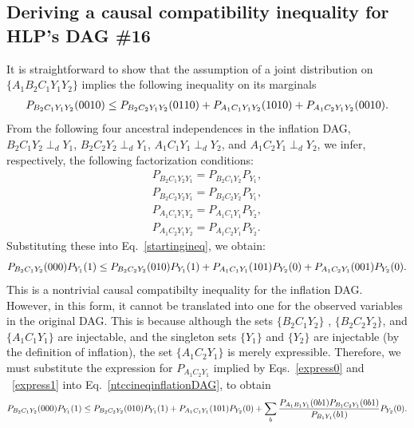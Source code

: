 \documentclass[aps,english,10pt,superscriptaddress,onecolumn,twoside,longbibliography,pra,floatfix,fleqn,nofootinbib]{revtex4-1}%
\theoremstyle{definition}
\newcounter{example}[section]
\newcommand{\p}[2][]{{P_{#1}}\parenths{#2}}
\DeclarePairedDelimiter{\parenths}{\lparen}{\rparen}
\begin{document}

\subsection{Deriving a causal compatibility inequality for HLP's DAG \#16}

It is straightforward to show that the assumption of a joint distribution on $\{ A_1 B_2 C_1 Y_1 Y_2\}$ implies the following inequality on its marginals
\begin{align}\label{startingineq}
    \p[B_2 C_1Y_1 Y_2]{0010} \leq \p[B_2 C_2Y_1 Y_2]{0110} + \p[A_1 C_1 Y_1 Y_2]{10 10}+\p[A_1 C_2 Y_1 Y_2]{0010}.
\end{align}
From the following four ancestral independences in the inflation DAG, $B_2 C_1  Y_2 \perp_d Y_1$, $B_2 C_2 Y_2 \perp_d Y_1$, $A_1 C_1 Y_1 \perp_d Y_2$, and $A_1 C_2 Y_1 \perp_d Y_2$, we infer, respectively, the following factorization conditions:
\begin{align}
P_{B_2 C_1  Y_2 Y_1}=P_{B_2 C_1  Y_2}P_{Y_1},\nonumber\\
P_{B_2 C_2 Y_2 Y_1}=P_{B_2 C_2  Y_2}P_{Y_1},\nonumber\\
P_{A_1 C_1 Y_1  Y_2}=P_{A_1 C_1 Y_1 }P_{Y_2},\nonumber\\
P_{A_1 C_2 Y_1  Y_2}=P_{A_1 C_2 Y_1 }P_{Y_2}.
\end{align}
Substituting these into Eq.~\eqref{startingineq}, we obtain:
\begin{align}\label{ntccineqinflationDAG}
    \p[B_2 C_1Y_2 ]{000}\p[Y_1]{1} \leq \p[B_2 C_2Y_2]{010} \p[ Y_1]{1} + \p[A_1 C_1 Y_1 ]{10 1}\p[Y_2]{0}+\p[A_1 C_2 Y_1]{001}\p[ Y_2]{0}.
\end{align}
This is a nontrivial causal compatibilty inequality for the inflation DAG. However, in this form, it cannot be translated into one for the observed variables in the original DAG.  This is because although the sets $\{B_2 C_1 Y_2 \}$ , $\{ B_2 C_2 Y_2\}$, and $\{ A_1 C_1 Y_1\}$ are injectable, and the singleton sets $\{ Y_1\} $ and $\{Y_2\}$ are injectable (by the definition of inflation), the set $\{ A_1 C_2 Y_1 \}$ is merely expressible.  Therefore, we must substitute the expression for $P_{A_1 C_2 Y_1}$ implied by Eqs.~\eqref{express0} and ~\eqref{express1} into Eq.~\eqref{ntccineqinflationDAG}, to obtain
\begin{align}\label{ntccineqinflationDAG2}
    \p[B_2 C_1Y_2 ]{000}\p[Y_1]{1} \leq \p[B_2 C_2 Y_2]{010} \p[ Y_1]{1} + \p[A_1 C_1 Y_1 ]{10 1}\p[Y_2]{0}+\sum_{b} \frac{P_{A_1 B_1 Y_1}(0 b 1) P_{B_1 C_2  Y_1}(0 b 1) }{P_{B_1 Y_1}(b 1)}  \p[ Y_2]{0}.
\end{align}
\end{document}
